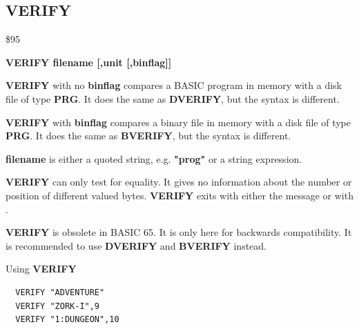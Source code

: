 \subsection{VERIFY}
\begin{description}[leftmargin=2cm,style=nextline]
\item [Token:] \$95
\item [Format:] {\bf VERIFY filename [,unit [,binflag]] }
\item [Usage:] {\bf VERIFY} with no {\bf binflag} compares a BASIC program
                in memory with a disk file of type {\bf PRG}.
                It does the same as {\bf DVERIFY}, but the syntax is different.

               {\bf VERIFY} with {\bf binflag} compares a binary file
               in memory with a disk file of type {\bf PRG}.
               It does the same as {\bf BVERIFY}, but the syntax is different.

               {\bf filename} is either a quoted string, e.g. {\bf "prog"} or
               a string expression.

               \unitdefinition

\item [Remarks:]
   {\bf VERIFY} can only test for equality. It gives no information
   about the number or position of different valued bytes.
    {\bf VERIFY} exits with either the message 
   or with .

   {\bf VERIFY} is obsolete in BASIC 65. It is only here for backwards
    compatibility. It is recommended to use {\bf DVERIFY} and {\bf BVERIFY} instead.


\item [Examples:] Using {\bf VERIFY}
\begin{tcolorbox}[colback=black,coltext=white]
\verbatimfont{\codefont}
\begin{verbatim}
  VERIFY "ADVENTURE"
  VERIFY "ZORK-I",9
  VERIFY "1:DUNGEON",10
\end{verbatim}
\end{tcolorbox}
\end{description}


\newpage
